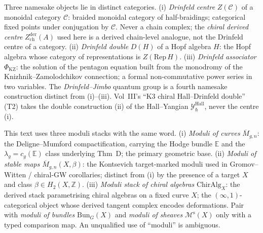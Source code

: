\begin{description}[itemsep=4pt, leftmargin=2.0em, style=nextline]
\item[T11 (``Drinfeld''--three namesake objects).]
%
Three namesake objects lie in distinct categories.
(i) \emph{Drinfeld centre} $Z(\mathcal C)$ of a monoidal category
$\mathcal C$: braided monoidal category of half-braidings;
categorical fixed points under conjugation by $\mathcal C$. Never a
chain complex; the \emph{chiral derived centre}
$Z^{\mathrm{der}}_{\mathrm{ch}}(A)$ used here is a derived chain-level
analogue, not the Drinfeld centre of a category.
(ii) \emph{Drinfeld double} $D(H)$ of a Hopf algebra $H$: the Hopf
algebra whose category of representations is $Z(\mathrm{Rep}\,H)$.
(iii) \emph{Drinfeld associator} $\Phi_{\mathrm{KZ}}$: the solution
of the pentagon equation built from the monodromy of the
Knizhnik--Zamolodchikov connection; a formal non-commutative power
series in two variables.
The \emph{Drinfeld--Jimbo} quantum group is a fourth namesake
construction distinct from (i)--(iii). Vol~III's ``K3 chiral
Hall--Drinfeld double'' (T2) takes the double construction (ii) of
the Hall--Yangian $\mathcal Y^{\mathrm{Hall}}_\hbar$, never the
centre (i).

\item[T12 (``moduli''--three distinct stacks).]
%
This text uses three moduli stacks with the same word.
(i) \emph{Moduli of curves} $\overline{M}_{g,n}$: the
Deligne--Mumford compactification, carrying the Hodge bundle
$\mathbb E$ and the $\lambda_g = c_g(\mathbb E)$ class
underlying Thm~D; the primary geometric base.
(ii) \emph{Moduli of stable maps} $\overline{M}_{g,n}(X, \beta)$:
the Kontsevich target-marked moduli used in
Gromov--Witten / chiral-GW corollaries; distinct from (i) by the
presence of a target $X$ and class $\beta \in H_2(X,\mathbb Z)$.
(iii) \emph{Moduli stack of chiral algebras}
$\mathrm{ChirAlg}_X$: the derived stack parametrising chiral
algebras on a fixed curve $X$; the $(\infty,1)$-categorical object
whose derived tangent complex encodes deformations.
Pair with \emph{moduli of bundles} $\mathrm{Bun}_G(X)$ and
\emph{moduli of sheaves} $\mathcal M^{\mathrm{s}}(X)$ only with a
typed comparison map. An unqualified use of ``moduli'' is ambiguous.


\end{description}
